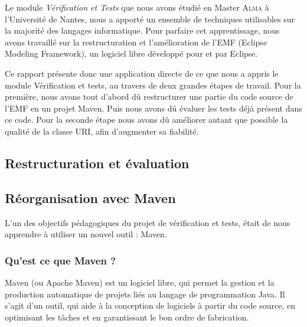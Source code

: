 \documentclass[a4paper]{article}
\begin{document}
	\vspace{0.5cm}

	Le module \textit{Vérification et Tests} que nous avons étudié en Master \textsc{Alma} à l’Université de Nantes, nous a apporté un ensemble de techniques utilisables sur la majorité des langages informatique. Pour parfaire cet apprentissage, nous avons travaillé sur la restructuration et l'amélioration de l'EMF (Eclipse Modeling Framework), un logiciel libre développé pour et par Eclipse.

	\vspace{0.5cm}

	Ce rapport présente donc une application directe de ce que nous a appris le module Vérification et tests, au travers de deux grandes étapes de travail. Pour la première, nous avons tout d'abord dû restructurer une partie du code source de l'EMF en un projet Maven. Puis nous avons dû évaluer les tests déjà présent dans ce code. Pour la seconde étape nous avons dû améliorer autant que possible la qualité de la classe URI, afin d'augmenter sa fiabilité.

	\newpage


	\begin{center}
		\section{Restructuration et évaluation}
	\end{center}

	\vspace{0.5cm}

		\subsection{Réorganisation avec Maven}

		\vspace{0.5cm}

		L'un des objectifs pédagogiques du projet de vérification et tests, était de nous apprendre à utiliser un nouvel outil : Maven. 

		\subsubsection{Qu'est ce que Maven ?}

		\vspace{0.5cm}

		Maven (ou Apache Maven) est un logiciel libre, qui permet la gestion et la production automatique de projets liés au langage de programmation Java. Il s'agit d'un outil, qui aide à la conception de logiciels à partir du code source, en optimisant les tâches et en garantissant le bon ordre de fabrication.
\end{document}
